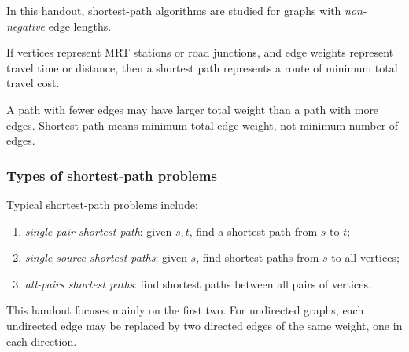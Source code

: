 In this handout, shortest-path algorithms are studied for graphs with \emph{non-negative} edge lengths.

\begin{examplebox}[title={Shortest path interpretation}]
If vertices represent MRT stations or road junctions, and edge weights represent travel time or distance, then a shortest path represents a route of minimum total travel cost.
\end{examplebox}

\begin{commonmistake}[title={Fewest edges need not mean shortest path}]
A path with fewer edges may have larger total weight than a path with more edges. Shortest path means minimum total edge weight, not minimum number of edges.
\end{commonmistake}

\subsubsection{Types of shortest-path problems}

Typical shortest-path problems include:
\begin{enumerate}[leftmargin=*]
    \item \emph{single-pair shortest path}: given \(s,t\), find a shortest path from \(s\) to \(t\);
    \item \emph{single-source shortest paths}: given \(s\), find shortest paths from \(s\) to all vertices;
    \item \emph{all-pairs shortest paths}: find shortest paths between all pairs of vertices.
\end{enumerate}

This handout focuses mainly on the first two. For undirected graphs, each undirected edge may be replaced by two directed edges of the same weight, one in each direction.

\begin{center}
\end{center}

